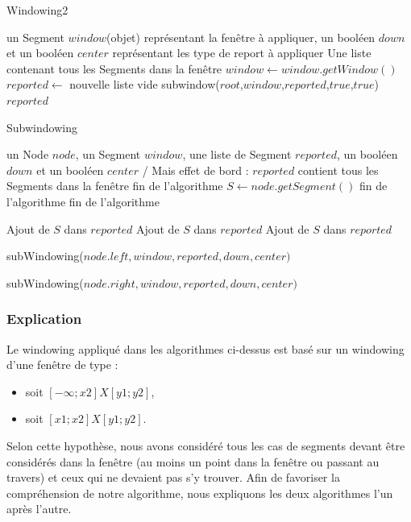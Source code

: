 \documentclass[10pt,a4paper]{article}
\begin{document}
\begin{algorithm}
\caption{Windowing2}
\begin{algorithmic}[1]
\REQUIRE un Segment $window$(objet) représentant la fenêtre à appliquer, un booléen $down$ et un booléen $center$ représentant les type de report à appliquer
\ENSURE Une liste contenant tous les Segments dans la fenêtre
\STATE $window \leftarrow window.getWindow()$
\STATE $reported \leftarrow$ nouvelle liste vide
\STATE subwindow($root$,$window$,$reported$,$true$,$true$)
\RETURN $reported$
\end{algorithmic}
\end{algorithm}

\newpage

\begin{algorithm}
\caption{Subwindowing}
\begin{algorithmic}[1]
\REQUIRE un Node $node$, un Segment $window$, une liste de Segment $reported$, un booléen $down$ et un booléen $center$
\ENSURE / Mais effet de bord : $reported$ contient tous les Segments dans la fenêtre
\STATE fin de l'algorithme
\ENDIF
\STATE $S \leftarrow node.getSegment()$
\STATE fin de l'algorithme
\ENDIF
{}
\STATE fin de l'algorithme
\ENDIF


\STATE Ajout de $S$ dans $reported$
\ENDIF
{}
\STATE Ajout de $S$ dans $reported$
\ENDIF
{}
\STATE Ajout de $S$ dans $reported$
\ENDIF

\STATE subWindowing($node.left,window,reported,down,center)$
\ENDIF

\STATE subWindowing($node.right,window,reported,down,center)$
\ENDIF

\end{algorithmic}
\end{algorithm}


\subsubsection{Explication}

Le windowing appliqué dans les algorithmes ci-dessus est basé sur un windowing d'une fenêtre de type : \begin{itemize}
\item soit $[-\infty;x2]X[y1;y2]$,
\item soit $[x1;x2]X[y1;y2]$.
\end{itemize}
Selon cette hypothèse, nous avons considéré tous les cas de segments devant être considérés dans la fenêtre (au moins un point dans la fenêtre ou passant au travers) et ceux qui ne devaient pas s'y trouver. Afin de favoriser la compréhension de notre algorithme, nous expliquons les deux algorithmes l'un après l'autre.
\end{document}
